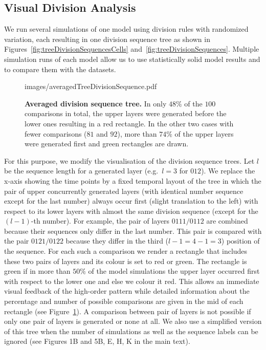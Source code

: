 \documentclass[11pt,a4paper, final]{article}
\begin{document}
\subsection{Visual Division Analysis}
\label{sec:visualAnalysis}
\noindent
We run several simulations of one model using division rules with randomized variation, each resulting in one division sequence tree as shown in Figures~\ref{fig:treeDivisionSequencesCells} and~\ref{fig:treeDivisionSequences}. Multiple simulation runs of each model allow us to use statistically solid model results and to compare them with the datasets.
%
\begin{figure}[htbp]
	\begin{center}
		\begin{overpic}[width=0.4\linewidth]{images/averagedTreeDivisionSequence.pdf}
		\end{overpic}
\caption[]
{
{\bf Averaged division sequence tree.} In only $48 \%$ of the $100$ comparisons in total, the upper layers were generated before the lower ones resulting in a red rectangle. In the other two cases with fewer comparisons ($81$ and $92$), more than $74 \%$ of the upper layers were generated first and green rectangles are drawn.
}
	\label{fig:averagedTreeDivisionSequence}
	\end{center}
\end{figure}
%
For this purpose, we modify the visualisation of the division sequence trees. Let $l$ be the sequence length for a generated layer (e.g.\ $l=3$ for $012$). We replace the x-axis showing the time points by a fixed temporal layout of the tree in which the pair of upper concurrently generated layers (with identical number sequence except for the last number) always occur first (slight translation to the left) with respect to its lower layers with almost the same division sequence (except for the $(l-1)$-th number). For example, the pair of layers $0111/0112$ are combined because their sequences only differ in the last number. This pair is compared with the pair $0121/0122$ because they differ in the third ($l-1 = 4-1 = 3$) position of the sequence. For each such a comparison we render a rectangle that includes these two pairs of layers and its colour is set to red or green. The rectangle is green if in more than $50 \%$ of the model simulations the upper layer occurred first with respect to the lower one and else we colour it red. This allows an immediate visual feedback of the high-order pattern while detailed information about the percentage and number of possible comparisons are given in the mid of each rectangle (see Figure~\ref{fig:averagedTreeDivisionSequence}). A comparison between pair of layers is not possible if only one pair of layers is generated or none at all. We also use a simplified version of this tree when the number of simulations as well as the sequence labels can be ignored (see Figures 1B and 5B, E, H, K in the main text).
\end{document}
